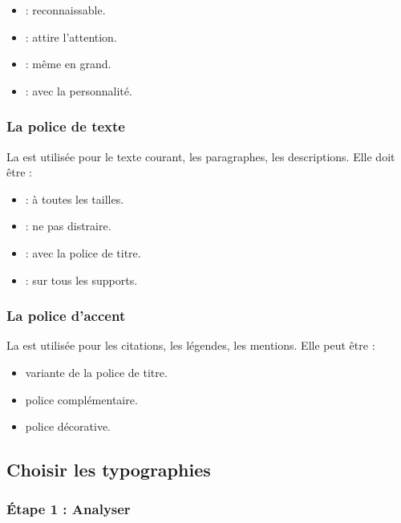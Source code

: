 \begin{itemize}
    \item {} : reconnaissable.
    \item {} : attire l'attention.
    \item {} : même en grand.
    \item {} : avec la personnalité.
\end{itemize}

\subsubsection{La police de texte}

La  est utilisée pour le texte courant, les paragraphes, les descriptions. Elle doit être :

\begin{itemize}
    \item {} : à toutes les tailles.
    \item {} : ne pas distraire.
    \item {} : avec la police de titre.
    \item {} : sur tous les supports.
\end{itemize}

\subsubsection{La police d'accent}

La  est utilisée pour les citations, les légendes, les mentions. Elle peut être :

\begin{itemize}
    \item {} variante de la police de titre.
    \item {} police complémentaire.
    \item {} police décorative.
\end{itemize}

\subsection{Choisir les typographies}

\subsubsection{Étape 1 : Analyser}

